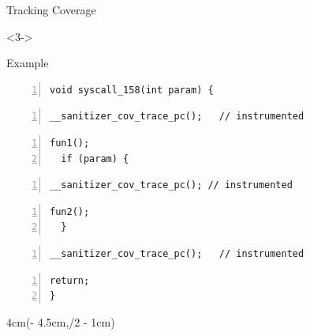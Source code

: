 \begin{frame}[fragile]{\syz}{Tracking Coverage}

  \begin{uncoverenv}<3->
  \end{uncoverenv}

  \medskip

  \begin{block}{Example}
  \bigskip
  \begin{lstlisting}[belowskip=0pt,numbers=left,xleftmargin=2.5em,
    frame=leftline]
void syscall_158(int param) {
  \end{lstlisting}
  \begin{lstlisting}[aboveskip=0pt,belowskip=0pt,numbers=left,xleftmargin=2.5em,
    frame=leftline,firstnumber=last]
  __sanitizer_cov_trace_pc();   // instrumented
  \end{lstlisting}
  \begin{lstlisting}[aboveskip=0pt,belowskip=0pt,numbers=left,xleftmargin=2.5em,
    frame=leftline,firstnumber=last]
  fun1();
  if (param) {
  \end{lstlisting}
  \begin{lstlisting}[aboveskip=0pt,belowskip=0pt,numbers=left,xleftmargin=2.5em,
    frame=leftline,firstnumber=last]
    __sanitizer_cov_trace_pc(); // instrumented
  \end{lstlisting}
  \begin{lstlisting}[aboveskip=0pt,belowskip=0pt,numbers=left,xleftmargin=2.5em,
    frame=leftline,firstnumber=last]
    fun2();
  }
  \end{lstlisting}
  \begin{lstlisting}[aboveskip=0pt,belowskip=0pt,numbers=left,xleftmargin=2.5em,
    frame=leftline,firstnumber=last]
  __sanitizer_cov_trace_pc();   // instrumented
  \end{lstlisting}
  \begin{lstlisting}[aboveskip=0pt,belowskip=0pt,numbers=left,xleftmargin=2.5em,
    frame=leftline,firstnumber=last]
  return;
}
  \end{lstlisting}
  \bigskip
  \end{block}

  \begin{textblock*}{4cm}(\paperwidth - 4.5cm,\textheight/2 - 1cm)
\end{textblock*}
\end{frame}
